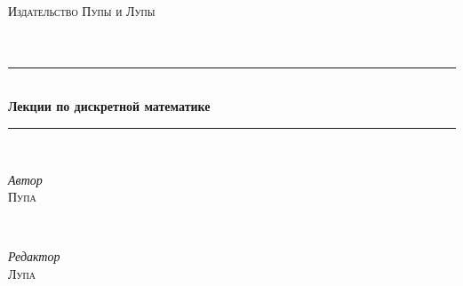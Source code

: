 \documentclass[a4paper,oneside]{article}
\theoremstyle{definition}
\theoremstyle{definition}
\theoremstyle{definition}
\begin{document}

\begin{titlepage} %
	\newcommand{\HRule}{\rule{\linewidth}{0.5mm}} %
	
	\center %
	
	
	\textsc{\LARGE Издательство Пупы и Лупы}\\[1.5cm] %
	
	\textsc{\Large }\\[0.5cm] %
	
	\textsc{\large }\\[0.5cm] %
	
	
	\HRule\\[0.4cm]
	
	{\huge\bfseries Лекции по дискретной математике}\\[0.4cm] %
	
	\HRule\\[1.5cm]
	
	
	\begin{minipage}{0.4\textwidth}
		\begin{flushleft}
			\large
			\textit{Автор}\\
			\textsc{Пупа} %
		\end{flushleft}
	\end{minipage}
	~
	\begin{minipage}{0.4\textwidth}
		\begin{flushright}
			\large
			\textit{Редактор}\\
			\textsc{Лупа} %
		\end{flushright}
	\end{minipage}
	

\end{titlepage}
\end{document}
